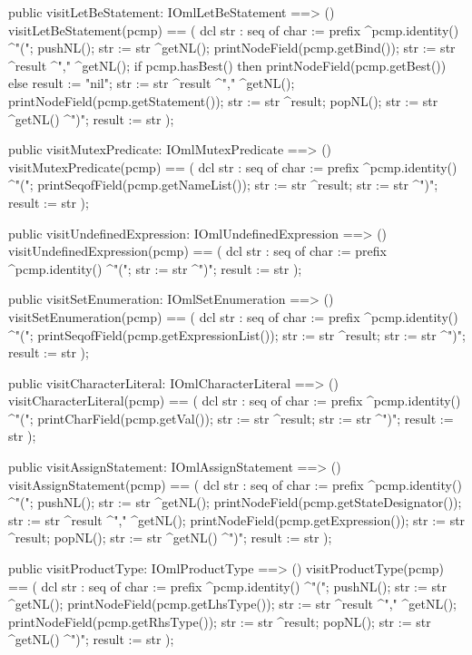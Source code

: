 \begin{vdm_al}
  public visitLetBeStatement: IOmlLetBeStatement ==> ()
  visitLetBeStatement(pcmp) ==
    ( dcl str : seq of char := prefix ^pcmp.identity() ^"(";
      pushNL();
      str := str ^getNL();
      printNodeField(pcmp.getBind());
      str := str ^result ^"," ^getNL();
      if pcmp.hasBest()
      then printNodeField(pcmp.getBest())
      else result := "nil";
      str := str ^result ^"," ^getNL();
      printNodeField(pcmp.getStatement());
      str := str ^result;
      popNL();
      str := str ^getNL() ^")";
      result := str );

  public visitMutexPredicate: IOmlMutexPredicate ==> ()
  visitMutexPredicate(pcmp) ==
    ( dcl str : seq of char := prefix ^pcmp.identity() ^"(";
      printSeqofField(pcmp.getNameList());
      str := str ^result;
      str := str ^")";
      result := str );

  public visitUndefinedExpression: IOmlUndefinedExpression ==> ()
  visitUndefinedExpression(pcmp) ==
    ( dcl str : seq of char := prefix ^pcmp.identity() ^"(";
      str := str ^")";
      result := str );

  public visitSetEnumeration: IOmlSetEnumeration ==> ()
  visitSetEnumeration(pcmp) ==
    ( dcl str : seq of char := prefix ^pcmp.identity() ^"(";
      printSeqofField(pcmp.getExpressionList());
      str := str ^result;
      str := str ^")";
      result := str );

  public visitCharacterLiteral: IOmlCharacterLiteral ==> ()
  visitCharacterLiteral(pcmp) ==
    ( dcl str : seq of char := prefix ^pcmp.identity() ^"(";
      printCharField(pcmp.getVal());
      str := str ^result;
      str := str ^")";
      result := str );

  public visitAssignStatement: IOmlAssignStatement ==> ()
  visitAssignStatement(pcmp) ==
    ( dcl str : seq of char := prefix ^pcmp.identity() ^"(";
      pushNL();
      str := str ^getNL();
      printNodeField(pcmp.getStateDesignator());
      str := str ^result ^"," ^getNL();
      printNodeField(pcmp.getExpression());
      str := str ^result;
      popNL();
      str := str ^getNL() ^")";
      result := str );

  public visitProductType: IOmlProductType ==> ()
  visitProductType(pcmp) ==
    ( dcl str : seq of char := prefix ^pcmp.identity() ^"(";
      pushNL();
      str := str ^getNL();
      printNodeField(pcmp.getLhsType());
      str := str ^result ^"," ^getNL();
      printNodeField(pcmp.getRhsType());
      str := str ^result;
      popNL();
      str := str ^getNL() ^")";
      result := str );


\end{vdm_al}
